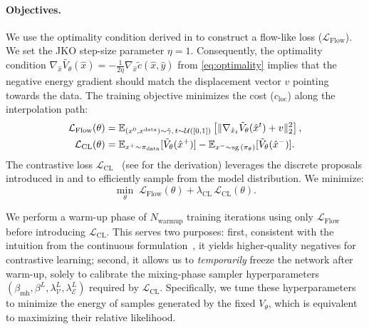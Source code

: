 \paragraph{Objectives.}
We use the optimality condition derived in  to construct a flow-like loss ($\mathcal{L}_{\text{Flow}}$). We set the JKO step-size parameter $\eta=1$. Consequently, the optimality condition $\nabla_{\hat{x}} \tilde{V_\theta}(\hat{x}) = - \frac{1}{2 \eta}\nabla_{\hat{x}} \tilde{c}(\hat{x},\hat{y})$ from \eqref{eq:optimality} implies that the negative energy gradient should match the displacement vector $v$ pointing towards the data. %
The training objective minimizes the cost ($c_{\text{loc}}$) along the interpolation path:
\begin{align}
\mathcal{L}_{\text{Flow}}(\theta)
&=
\mathbb{E}_{(x^0,x^\mathrm{data})\sim\tilde{\gamma},\,t\sim\mathcal{U}([0,1])}\left[
\|\nabla_{\hat{x}_t} \tilde{V}_\theta(\hat{x}^t)+v\|_2^2
\right],\\
\mathcal{L}_{\text{CL}}(\theta)
&=
\mathbb{E}_{x^{+}\sim \pi_\mathrm{data}}[\tilde{V}_\theta(\hat{x}^{+})]
-\mathbb{E}_{x^{-}\sim \text{sg}\,(\pi_\theta)}[\tilde{V}_\theta(\hat{x}^{-})].
\label{eq:cl}
\end{align} 
The contrastive loss $\mathcal{L}_{\text{CL}}$~\cite{hinton2002training} (see  for the derivation) leverages the discrete proposals introduced in  and  to efficiently sample from the model distribution.
 We minimize:
\begin{equation}
\min_\theta\;
\mathcal{L}_{\text{Flow}}(\theta)
+\lambda_{\text{CL}}\,
\mathcal{L}_{\text{CL}}(\theta).
\end{equation}


We perform a warm-up phase of $N_{\mathrm{warmup}}$ training iterations using only $\mathcal{L}_{\text{Flow}}$ before introducing $\mathcal{L}_{\text{CL}}$. This serves two purposes: first, consistent with the intuition from the continuous formulation~\citep{balcerak2025energy}, it yields higher-quality negatives for contrastive learning; second, it allows us to \emph{temporarily} freeze the network after warm-up, solely to calibrate the mixing-phase sampler hyperparameters $(\beta_{\mathrm{mh}}, \beta^L, \lambda_{\mathcal V}^L, \lambda_{\mathcal E}^L)$ required by $\mathcal{L}_{\text{CL}}$. Specifically, we tune these hyperparameters to minimize the energy of samples generated by the fixed $V_\theta$, which is equivalent to maximizing their relative likelihood.

